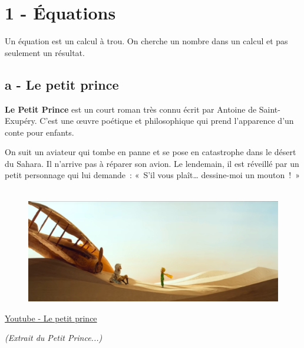 \documentclass[11pt]{article}
\begin{document}
\setlength{\columnseprule}{1pt}

\section*{1 - Équations}

Un équation est un calcul à trou. On cherche un nombre dans un calcul et pas seulement un résultat. 

\subsection*{a - Le petit prince}

\textbf{Le Petit Prince} est un court roman très connu écrit par Antoine de Saint-Exupéry. C'est une œuvre poétique et philosophique qui prend l'apparence d'un conte pour enfants. 

On suit un aviateur qui tombe en panne et se pose en catastrophe dans le désert du Sahara. Il n’arrive pas à réparer son avion. Le lendemain, il est réveillé par un petit personnage qui lui demande : « S'il vous plaît… dessine-moi un mouton ! » 

\begin{figure}[H]
        \centering
        \includegraphics[width=0.5\linewidth]{3x11-equations/pp.png}
\end{figure}
\begin{center}
    \href{https://www.youtube.com/watch?v=JOWw5OaaZf8}{Youtube - Le petit prince} 
\end{center}


\textit{(Extrait du Petit Prince...)}
\end{document}
